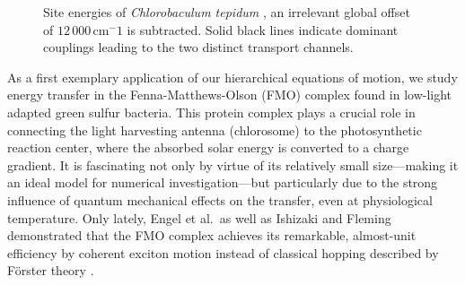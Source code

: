 \begin{figure}[p]
  \caption{%
    Site energies of \emph{Chlorobaculum tepidum} \cite{AdRe06_fmo}, an irrelevant global offset of $12\,000\,\mathrm{cm^-1}$ is subtracted.
    Solid black lines indicate dominant couplings leading to the two distinct transport channels.
    \label{fig:app.site_energies}
  }
\end{figure}


As a first exemplary application of our hierarchical equations of motion, we study energy transfer in the Fenna-Matthews-Olson (FMO) complex found in low-light adapted green sulfur bacteria.
This protein complex plays a crucial role in connecting the light harvesting antenna (chlorosome) to the photosynthetic reaction center, where the absorbed solar energy is converted to a charge gradient.
It is fascinating not only by virtue of its relatively small size---making it an ideal model for numerical investigation---but particularly due to the strong influence of quantum mechanical effects on the transfer, even at physiological temperature.
Only lately, Engel et al.\ as well as Ishizaki and Fleming demonstrated that the FMO complex achieves its remarkable, almost-unit efficiency by coherent exciton motion instead of classical hopping described by Förster theory \cite{EnCaRe07_fmo,IsFl09_fmo}. \\



